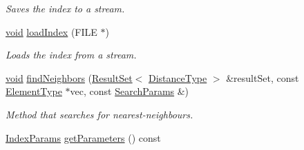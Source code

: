 \begin{DoxyCompactItemize}
\begin{DoxyCompactList}\small\item\em Saves the index to a stream. \end{DoxyCompactList}\item 
\hyperlink{legacy_8hpp_a8bb47f092d473522721002c86c13b94e}{void} \hyperlink{classcvflann_1_1LinearIndex_a5b6761e8a0030c7385fe9474a9a06a05}{load\-Index} (F\-I\-L\-E $\ast$)
\begin{DoxyCompactList}\small\item\em Loads the index from a stream. \end{DoxyCompactList}\item 
\hyperlink{legacy_8hpp_a8bb47f092d473522721002c86c13b94e}{void} \hyperlink{classcvflann_1_1LinearIndex_ac2ac4c45a06c8c196e83edee9c343287}{find\-Neighbors} (\hyperlink{classcvflann_1_1ResultSet}{Result\-Set}$<$ \hyperlink{classcvflann_1_1LinearIndex_a2856b8b90987bac8737fdb08b5ad693f}{Distance\-Type} $>$ \&result\-Set, const \hyperlink{classcvflann_1_1LinearIndex_a7a42eebeec43b6f10fd8e2ffb6516959}{Element\-Type} $\ast$vec, const \hyperlink{structcvflann_1_1SearchParams}{Search\-Params} \&)
\begin{DoxyCompactList}\small\item\em Method that searches for nearest-\/neighbours. \end{DoxyCompactList}\item 
\hyperlink{namespacecvflann_a742b4c7076c21012054af74a9ee48289}{Index\-Params} \hyperlink{classcvflann_1_1LinearIndex_abffc89dee04cc8a0a94d79852865d5e5}{get\-Parameters} () const 
\end{DoxyCompactItemize}


